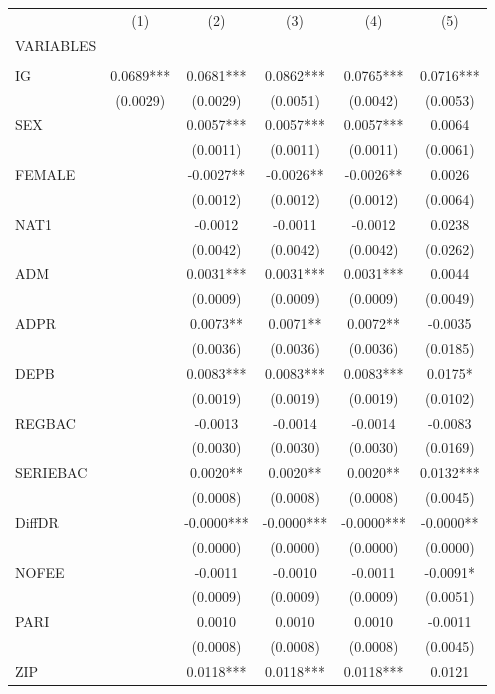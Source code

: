 \documentclass[]{article}
\begin{document}
\begin{tabular}{lccccc} \hline
 & (1) & (2) & (3) & (4) & (5) \\
VARIABLES &  &  &  &  &  \\ \hline
 &  &  &  &  &  \\
IG & 0.0689*** & 0.0681*** & 0.0862*** & 0.0765*** & 0.0716*** \\
 & (0.0029) & (0.0029) & (0.0051) & (0.0042) & (0.0053) \\
SEX &  & 0.0057*** & 0.0057*** & 0.0057*** & 0.0064 \\
 &  & (0.0011) & (0.0011) & (0.0011) & (0.0061) \\
FEMALE &  & -0.0027** & -0.0026** & -0.0026** & 0.0026 \\
 &  & (0.0012) & (0.0012) & (0.0012) & (0.0064) \\
NAT1 &  & -0.0012 & -0.0011 & -0.0012 & 0.0238 \\
 &  & (0.0042) & (0.0042) & (0.0042) & (0.0262) \\
ADM &  & 0.0031*** & 0.0031*** & 0.0031*** & 0.0044 \\
 &  & (0.0009) & (0.0009) & (0.0009) & (0.0049) \\
ADPR &  & 0.0073** & 0.0071** & 0.0072** & -0.0035 \\
 &  & (0.0036) & (0.0036) & (0.0036) & (0.0185) \\
DEPB &  & 0.0083*** & 0.0083*** & 0.0083*** & 0.0175* \\
 &  & (0.0019) & (0.0019) & (0.0019) & (0.0102) \\
REGBAC &  & -0.0013 & -0.0014 & -0.0014 & -0.0083 \\
 &  & (0.0030) & (0.0030) & (0.0030) & (0.0169) \\
SERIEBAC &  & 0.0020** & 0.0020** & 0.0020** & 0.0132*** \\
 &  & (0.0008) & (0.0008) & (0.0008) & (0.0045) \\
DiffDR &  & -0.0000*** & -0.0000*** & -0.0000*** & -0.0000** \\
 &  & (0.0000) & (0.0000) & (0.0000) & (0.0000) \\
NOFEE &  & -0.0011 & -0.0010 & -0.0011 & -0.0091* \\
 &  & (0.0009) & (0.0009) & (0.0009) & (0.0051) \\
PARI &  & 0.0010 & 0.0010 & 0.0010 & -0.0011 \\
 &  & (0.0008) & (0.0008) & (0.0008) & (0.0045) \\
ZIP &  & 0.0118*** & 0.0118*** & 0.0118*** & 0.0121 \\

\end{tabular}
\end{document}
